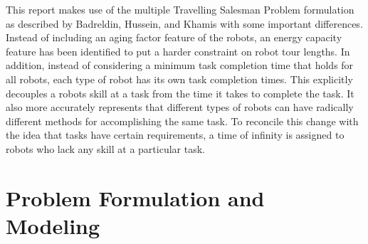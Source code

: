 \documentclass[a4paper]{article}
\begin{document}
This report makes use of the multiple Travelling Salesman Problem formulation as described by Badreldin, Hussein, and Khamis with some important differences. \cite{Badreldin} Instead of including an aging factor feature of the robots, an energy capacity feature has been identified to put a harder constraint on robot tour lengths. In addition, instead of considering a minimum task completion time that holds for all robots, each type of robot has its own task completion times. This explicitly decouples a robots skill at a task from the time it takes to complete the task. It also more accurately represents that different types of robots can have radically different methods for accomplishing the same task. To reconcile this change with the idea that tasks have certain requirements, a time of infinity is assigned to robots who lack any skill at a particular task.




%

\section{Problem Formulation and Modeling}

\end{document}
